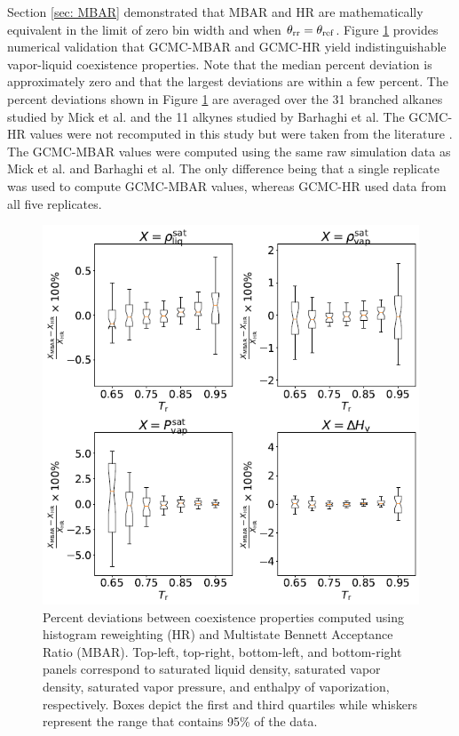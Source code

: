 \documentclass[journal=jced,manuscript=article]{achemso}
\begin{document}
Section \ref{sec: MBAR} demonstrated that MBAR and HR are mathematically equivalent in the limit of zero bin width and when $\theta_{\rm rr} = \theta_{\rm ref}$. Figure \ref{fig:comparison MBAR HR} provides numerical validation that GCMC-MBAR and GCMC-HR yield indistinguishable vapor-liquid coexistence properties. Note that the median percent deviation is approximately zero and that the largest deviations are within a few percent. The percent deviations shown in Figure \ref{fig:comparison MBAR HR} are averaged over the 31 branched alkanes studied by Mick et al. and the 11 alkynes studied by Barhaghi et al. The GCMC-HR values were not recomputed in this study but were taken from the literature \cite{Potoff_branched,Barhaghi2017}. The GCMC-MBAR values were computed using the same raw simulation data as Mick et al. and Barhaghi et al. The only difference being that a single replicate was used to compute GCMC-MBAR values, whereas GCMC-HR used data from all five replicates. 

	\begin{figure}[htb!]
		\centering
		\includegraphics[width=6.4in]{Comparison_MBAR_HR_boxplot_CI.png}
		\caption{Percent deviations between coexistence properties computed using histogram reweighting (HR) and Multistate Bennett Acceptance Ratio (MBAR). Top-left, top-right, bottom-left, and bottom-right panels correspond to saturated liquid density, saturated vapor density, saturated vapor pressure, and enthalpy of vaporization, respectively. Boxes depict the first and third quartiles while whiskers represent the range that contains 95\% of the data.}
		\label{fig:comparison MBAR HR}
	\end{figure}
\end{document}
